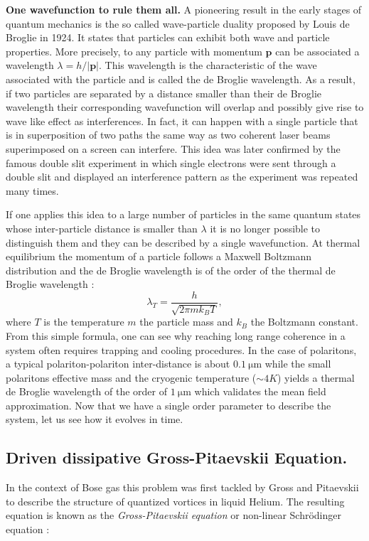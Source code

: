 \textbf{One wavefunction to rule them all.} A pioneering result in the early stages of quantum mechanics is the so called wave-particle duality proposed by Louis de Broglie \cite{deBroglie1925} in 1924.
It states that particles can exhibit both wave and particle properties. 
More precisely, to any particle with momentum $\mathbf{p}$ can be associated a wavelength $\lambda=h/|\mathbf{p}|$. This wavelength is the characteristic of the wave associated with the particle and is called the de Broglie wavelength. 
As a result, if two particles are separated by a distance smaller than their de Broglie wavelength their corresponding wavefunction will overlap and possibly give rise to wave like effect as interferences. In fact, it can happen with a single particle that is in superposition of two paths 
the same way as two coherent laser beams superimposed on a screen can interfere.
This idea was later confirmed by the famous double slit experiment in which single electrons were sent through a double slit and displayed an interference pattern as the experiment was repeated many times.

If one applies this idea to a large number of particles in the same quantum states whose inter-particle distance is smaller than $\lambda$ it is no longer possible to distinguish them and they can be described by a single wavefunction.
At thermal equilibrium the momentum of a particle follows a Maxwell Boltzmann distribution and the de Broglie wavelength is of the order of the thermal de Broglie wavelength :
\begin{equation}
    \lambda_T = \dfrac{h}{\sqrt{2\pi m k_B T}},
    \label{eq:thermal_deBroglie}
\end{equation}
where $T$ is the temperature $m$ the particle mass and $k_B$ the Boltzmann constant. From this simple formula, one can see why reaching long range coherence in a system often requires trapping and cooling procedures. In the case of polaritons,
a typical polariton-polariton inter-distance is about $\SI{0,1}{\micro\meter}$ while the small polaritons effective mass and the cryogenic temperature ($\sim 4K$) yields a thermal de Broglie wavelength of the order of $\SI{1}{\micro\meter}$ which validates the mean field approximation.
Now that we have a single order parameter to describe the system, let us see how it evolves in time.

\bigskip

\subsection{Driven dissipative Gross-Pitaevskii Equation.}
In the context of Bose gas this problem was first tackled by Gross \cite{Gross1961} and Pitaevskii \cite{pitaevskii1961} to describe
the structure of quantized vortices in liquid Helium. The resulting equation is known as the \textit{Gross-Pitaevskii equation} or non-linear Schrödinger equation :


